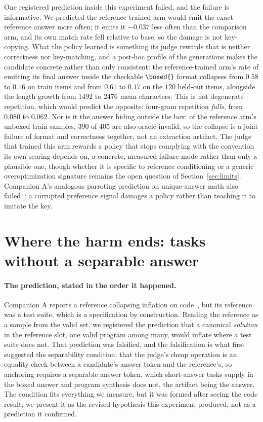 \documentclass[11pt]{article}
\begin{document}
One registered prediction inside this experiment failed, and the failure is informative.
We predicted the reference-trained arm would emit the exact reference answer more often; it emits it $-0.037$ less often than the comparison arm, and its own match rate fell relative to base, so the damage is not key-copying.
What the policy learned is something its judge rewards that is neither correctness nor key-matching, and a post-hoc profile of the generations makes the candidate concrete rather than only consistent: the reference-trained arm's rate of emitting its final answer inside the checkable \texttt{\textbackslash boxed\{\}} format collapses from $0.58$ to $0.16$ on train items and from $0.61$ to $0.17$ on the $120$ held-out items, alongside the length growth from $1492$ to $2476$ mean characters.
This is not degenerate repetition, which would predict the opposite: four-gram repetition \emph{falls}, from $0.080$ to $0.062$.
Nor is it the answer hiding outside the box: of the reference arm's unboxed train samples, $390$ of $405$ are also oracle-invalid, so the collapse is a joint failure of format and correctness together, not an extraction artifact.
The judge that trained this arm rewards a policy that stops complying with the convention its own scoring depends on, a concrete, measured failure mode rather than only a plausible one, though whether it is specific to reference conditioning or a generic overoptimization signature remains the open question of Section~\ref{sec:limits}.
Companion A's analogous parroting prediction on unique-answer math also failed~\cite{companionA}: a corrupted preference signal damages a policy rather than teaching it to imitate the key.

\section{Where the harm ends: tasks without a separable answer}
\label{sec:code}

\paragraph{The prediction, stated in the order it happened.}
Companion A reports a reference collapsing inflation on code~\cite{companionA}, but its reference was a test suite, which is a specification by construction.
Reading the reference as a sample from the valid set, we registered the prediction that a canonical \emph{solution} in the reference slot, one valid program among many, would inflate where a test suite does not.
That prediction was falsified, and the falsification is what first suggested the separability condition: that the judge's cheap operation is an equality check between a candidate's answer token and the reference's, so anchoring requires a separable answer token, which short-answer tasks supply in the boxed answer and program synthesis does not, the artifact being the answer.
The condition fits everything we measure, but it was formed after seeing the code result; we present it as the revised hypothesis this experiment produced, not as a prediction it confirmed.
\end{document}

